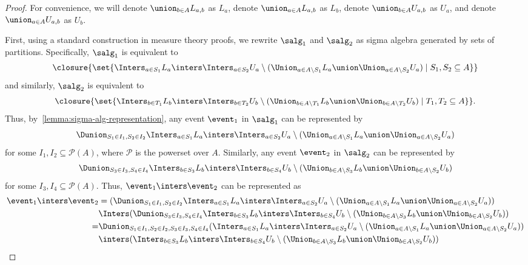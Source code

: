 \documentclass[acmsmall,nonacm,screen,appendix]{acmart}
\begin{document}
\begin{proof}
      For convenience, we will
      denote $\union_{b \in A} L_{a, b}$ as $L_a$,
      denote $\union_{a \in A} L_{a, b}$ as $L_b$,
      denote $\union_{b \in A} U_{a, b}$ as $U_a$,
      and denote $\union_{a \in A} U_{a, b}$ as $U_b$.




      First, using a standard construction in measure theory proofs,
      we rewrite $\salg_1$ and $\salg_2$ as sigma algebra generated
      by sets of partitions.
      Specifically, $\salg_1$ is equivalent to
      \[
        \closure{\set{\Inters_{a \in S_1} L_a \inters \Inters_{a \in S_2} U_a \setminus (\Union_{a \in A \setminus S_1} L_a \union \Union_{a \in A \setminus S_2} U_a)  \mid S_1, S_2 \subseteq A}}
      \]
      and similarly, $\salg_2$ is equivalent to
      \[
        \closure{\set{\Inters_{b \in T_1} L_b \inters \Inters_{b \in T_2} U_b \setminus (\Union_{b \in A \setminus T_1} L_b \union \Union_{b \in A \setminus T_2} U_b)  \mid T_1, T_2 \subseteq A}}.
      \]
      Thus, by~\cref{lemma:sigma-alg-representation}, any event $\event_1$ in
      $\salg_1$ can be represented by
      \[
        \Dunion_{S_1 \in I_1, S_2 \in I_2}
        \Inters_{a \in S_1} L_a \inters \Inters_{a \in S_2} U_a \setminus (\Union_{a \in A \setminus S_1} L_a \union \Union_{a \in A \setminus S_2} U_a)
      \]
      for some $I_1, I_2 \subseteq \mathcal{P}(A)$, where
      $\mathcal{P}$ is the powerset over $A$.
      Similarly, any event $\event_2$ in $\salg_2$ can be represented by
      \[
        \Dunion_{S_3 \in I_3, S_4 \in I_4}
        \Inters_{b \in S_3} L_b \inters \Inters_{b \in S_4} U_b \setminus (\Union_{b \in A \setminus S_3} L_b \union \Union_{b \in A \setminus S_2} U_b)
      \]
      for some  $I_3, I_4 \subseteq \mathcal{P}(A)$.
      Thus, $\event_1 \inters \event_2$ can be represented as
      \begin{align*}
        \event_1 \inters \event_2
        &=(\Dunion_{S_1 \in I_1, S_2 \in I_2}
        \Inters_{a \in S_1} L_a \inters \Inters_{a \in S_2} U_a \setminus (\Union_{a \in A \setminus S_1} L_a \union \Union_{a \in A \setminus S_2} U_a) ) \\
        &\Inters
        (\Dunion_{S_3 \in I_3, S_4 \in I_4}
        \Inters_{b \in S_3} L_b \inters \Inters_{b \in S_4} U_b \setminus (\Union_{b \in A \setminus S_3} L_b \union \Union_{b \in A \setminus S_2} U_b) )\\
        = & \Dunion_{S_1 \in I_1, S_2 \in I_2, S_3 \in I_3, S_4 \in I_4} (\Inters_{a \in S_1} L_a \inters \Inters_{a \in S_2} U_a \setminus (\Union_{a \in A \setminus S_1} L_a \union \Union_{a \in A \setminus S_2} U_a) ) \\
          &\inters ( \Inters_{b \in S_3} L_b \inters \Inters_{b \in S_4} U_b \setminus (\Union_{b \in A \setminus S_3} L_b \union \Union_{b \in A \setminus S_2} U_b) )
      \end{align*}


\end{proof}
\end{document}
